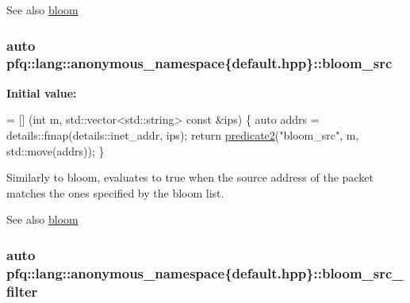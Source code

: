 \begin{DoxySeeAlso}{See also}
\hyperlink{namespacepfq_1_1lang_1_1anonymous__namespace_02default_8hpp_03_abfcd230137acb93cfd99f7a0a7c1f17f}{bloom} 
\end{DoxySeeAlso}
\hypertarget{namespacepfq_1_1lang_1_1anonymous__namespace_02default_8hpp_03_aa2a8ff506d61e93d8eca4419513970f4}{
\subsubsection[{bloom\+\_\+src}]{\setlength{\rightskip}{0pt plus 5cm}auto pfq\+::lang\+::anonymous\+\_\+namespace\{default.\+hpp\}\+::bloom\+\_\+src}}\label{namespacepfq_1_1lang_1_1anonymous__namespace_02default_8hpp_03_aa2a8ff506d61e93d8eca4419513970f4}
{\bfseries Initial value\+:}
\begin{DoxyCode}
= [] (\textcolor{keywordtype}{int} m, std::vector<std::string> \textcolor{keyword}{const} &ips) \{
                                \textcolor{keyword}{auto} addrs = details::fmap(details::inet\_addr, ips);
                                \textcolor{keywordflow}{return} \hyperlink{namespacepfq_1_1lang_a7282b9a2e51359b8db0dcdb9fadf2fd1}{predicate2}(\textcolor{stringliteral}{"bloom\_src"}, m, std::move(addrs));
                          \}
\end{DoxyCode}
Similarly to {\ttfamily bloom}, evaluates to {\ttfamily true} when the source address of the packet matches the ones specified by the bloom list. \begin{DoxySeeAlso}{See also}
\hyperlink{namespacepfq_1_1lang_1_1anonymous__namespace_02default_8hpp_03_abfcd230137acb93cfd99f7a0a7c1f17f}{bloom} 
\end{DoxySeeAlso}
\hypertarget{namespacepfq_1_1lang_1_1anonymous__namespace_02default_8hpp_03_a04d4dfefacab3230f7d17f0f797cd37e}{
\subsubsection[{bloom\+\_\+src\+\_\+filter}]{\setlength{\rightskip}{0pt plus 5cm}auto pfq\+::lang\+::anonymous\+\_\+namespace\{default.\+hpp\}\+::bloom\+\_\+src\+\_\+filter}}\label{namespacepfq_1_1lang_1_1anonymous__namespace_02default_8hpp_03_a04d4dfefacab3230f7d17f0f797cd37e}
